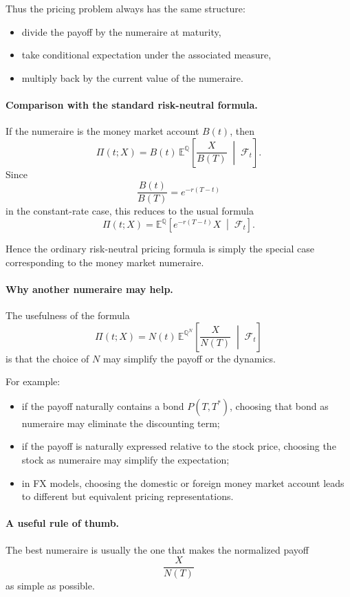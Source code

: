 \documentclass[11pt]{article}
\newcommand{\Qbb}{\mathbb{Q}}
\newcommand{\E}{\mathbb{E}}
\theoremstyle{definition}
\theoremstyle{plain}
\begin{document}
Thus the pricing problem always has the same structure:
\begin{itemize}[leftmargin=1.4em]
\item divide the payoff by the numeraire at maturity,
\item take conditional expectation under the associated measure,
\item multiply back by the current value of the numeraire.
\end{itemize}

\paragraph{Comparison with the standard risk-neutral formula.}
If the numeraire is the money market account \(B(t)\), then
\[
\Pi(t;X)
=
B(t)\,
\E^\Qbb\!\left[
\frac{X}{B(T)}
\;\middle|\;
\mathcal{F}_t
\right].
\]
Since
\[
\frac{B(t)}{B(T)}=e^{-r(T-t)}
\]
in the constant-rate case, this reduces to the usual formula
\[
\Pi(t;X)
=
\E^\Qbb\!\left[
e^{-r(T-t)}X
\;\middle|\;
\mathcal{F}_t
\right].
\]

Hence the ordinary risk-neutral pricing formula is simply the special
case corresponding to the money market numeraire.

\paragraph{Why another numeraire may help.}
The usefulness of the formula
\[
\Pi(t;X)
=
N(t)\,
\E^{\Qbb^N}\!\left[
\frac{X}{N(T)}
\;\middle|\;
\mathcal{F}_t
\right]
\]
is that the choice of \(N\) may simplify the payoff or the dynamics.

For example:
\begin{itemize}[leftmargin=1.4em]
\item if the payoff naturally contains a bond \(P(T,T^\ast)\), choosing
that bond as numeraire may eliminate the discounting term;
\item if the payoff is naturally expressed relative to the stock price,
choosing the stock as numeraire may simplify the expectation;
\item in FX models, choosing the domestic or foreign money market account
leads to different but equivalent pricing representations.
\end{itemize}

\paragraph{A useful rule of thumb.}
The best numeraire is usually the one that makes the normalized payoff
\[
\frac{X}{N(T)}
\]
as simple as possible.
\end{document}
